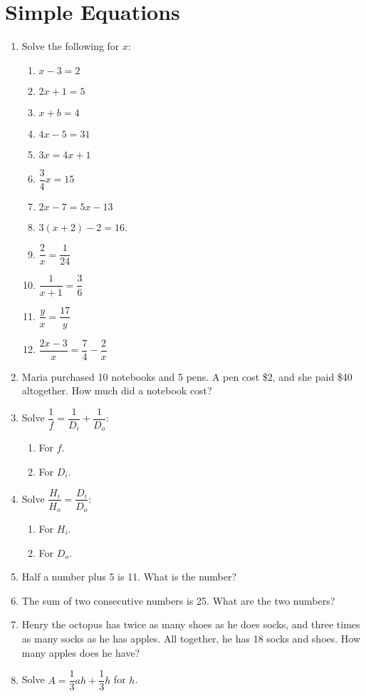 \documentclass{amsbook}
\begin{document}
\section{Simple Equations}
\begin{enumerate}
  \item Solve the following for $ x $:
    \begin{enumerate}
      \item $ x - 3 = 2 $
      \item $ 2x + 1 = 5 $
      \item $ x + b = 4 $
      \item $ 4x - 5 = 31 $
      \item $ 3x = 4x + 1 $
      \item $ \dfrac{3}{4} x = 15 $
      \item $ 2x - 7 = 5x - 13 $
      \item $ 3(x + 2) - 2 = 16 $.
      \item $ \dfrac{2}{x} = \dfrac{1}{24} $
      \item $ \dfrac{1}{x + 1} = \dfrac{3}{6} $
      \item $ \dfrac{y}{x} = \dfrac{17}{y} $
      \item $ \dfrac{2x - 3}{x} = \dfrac{7}{4} - \dfrac{2}{x} $
    \end{enumerate}
  \item Maria purchased 10 notebooks and 5 pens. A pen cost \$2, and she paid \$40 altogether. How much did a notebook cost?
  \item Solve $ \dfrac{1}{f} = \dfrac{1}{D_i} + \dfrac{1}{D_o} $:
    \begin{enumerate}
      \item For $ f $.
      \item For $ D_i $.
    \end{enumerate}
  \item Solve $ \dfrac{H_i}{H_o} = \dfrac{D_i}{D_o} $:
    \begin{enumerate}
      \item For $ H_i $.
      \item For $ D_o $.
    \end{enumerate}
  \item Half a number plus 5 is 11. What is the number?
  \item The sum of two consecutive numbers is 25. What are the two numbers?
  \item Henry the octopus has twice as many shoes as he does socks, and three times as many socks as he has apples. All together, he has 18
        socks and shoes. How many apples does he have?
  \item Solve $ A = \dfrac{1}{3}ah + \dfrac{1}{3}h $ for $ h $.
\end{enumerate}
\end{document}
